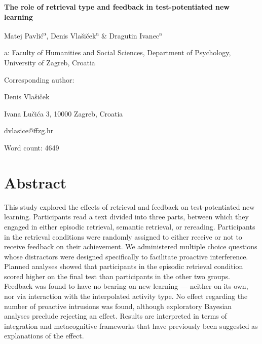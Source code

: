 \documentclass[12pt]{article}
\def\biblio{}
\begin{document}
\begin{titlepage}
    \begin{center}

        \vspace*{\fill}

        \Large
        \textbf{The role of retrieval type and feedback in test-potentiated 
        new learning}
        \normalsize

        \bigskip
        Matej Pavlić\textsuperscript{a}, Denis Vlašiček\textsuperscript{a} 
        \& Dragutin Ivanec\textsuperscript{a}

        a: Faculty of Humanities and Social Sciences, Department of 
        Psychology, University of Zagreb, Croatia

        \bigskip

        \raggedright
        Corresponding author:

        Denis Vlašiček

        Ivana Lučića 3, 10000 Zagreb, Croatia

        dvlasice@ffzg.hr

		\bigskip
		Word count: 4649
		
        \vspace*{\fill}

    \end{center}

\end{titlepage}

\def\biblio{}

\section{Abstract}

This study explored the effects of retrieval and feedback on 
test-potentiated new learning. Participants read a text divided into three 
parts, between which they engaged in either episodic retrieval, semantic 
retrieval, or rereading. Participants in the retrieval conditions were 
randomly assigned to either receive or not to receive feedback on their 
achievement. We administered multiple choice questions whose distractors 
were designed specifically to facilitate proactive interference. Planned 
analyses showed that participants in the episodic retrieval condition scored 
higher on the final test than participants in the other two groups. Feedback 
was found to have no bearing on new learning --- neither on its own, nor via 
interaction with the interpolated activity type. No effect regarding the 
number of proactive intrusions was found, although exploratory Bayesian 
analyses preclude rejecting an effect. Results are interpreted in terms of 
integration and metacognitive frameworks that have previously been suggested 
as explanations of the effect.
\end{document}
